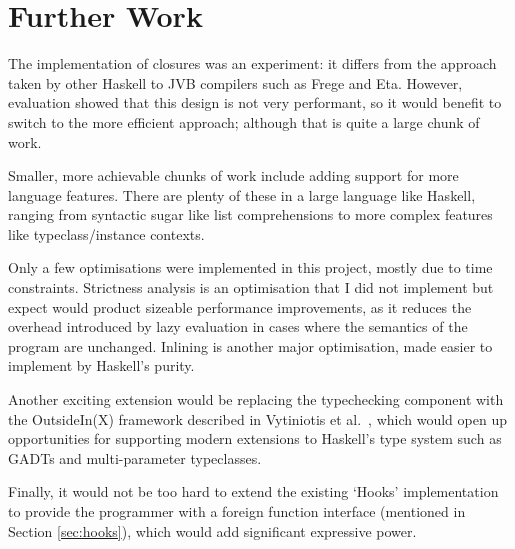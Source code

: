 \documentclass[dissertation.tex]{subfiles}
\begin{document}
\section{Further Work}
{
    The implementation of closures was an experiment: it differs from the approach taken by other Haskell to JVB compilers such as Frege and Eta. However, evaluation showed that this design is not very performant, so it would benefit \compilername to switch to the more efficient approach; although that is quite a large chunk of work.

    Smaller, more achievable chunks of work include adding support for more language features. There are plenty of these in a large language like Haskell, ranging from syntactic sugar like list comprehensions to more complex features like typeclass/instance contexts.

    Only a few optimisations were implemented in this project, mostly due to time constraints. Strictness analysis is an optimisation that I did not implement but expect would product sizeable performance improvements, as it reduces the overhead introduced by lazy evaluation in cases where the semantics of the program are unchanged. Inlining is another major optimisation, made easier to implement by Haskell's purity.

    Another exciting extension would be replacing the typechecking component with the OutsideIn(X) framework described in Vytiniotis et al.\ \cite{OutsideIn}, which would open up opportunities for supporting modern extensions to Haskell's type system such as GADTs and multi-parameter typeclasses. 

    Finally, it would not be too hard to extend the existing `Hooks' implementation to provide the programmer with a foreign function interface (mentioned in Section \ref{sec:hooks}), which would add significant expressive power.
}
\end{document}
